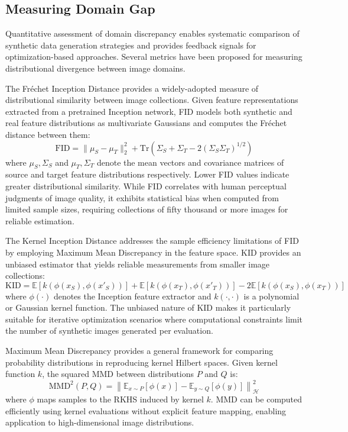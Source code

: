 \subsection{Measuring Domain Gap}

Quantitative assessment of domain discrepancy enables systematic comparison of synthetic data generation strategies and provides feedback signals for optimization-based approaches. Several metrics have been proposed for measuring distributional divergence between image domains.

The Fr\'{e}chet Inception Distance provides a widely-adopted measure of distributional similarity between image collections. Given feature representations extracted from a pretrained Inception network, FID models both synthetic and real feature distributions as multivariate Gaussians and computes the Fr\'{e}chet distance between them:
\begin{equation}
\text{FID} = \|\mu_S - \mu_T\|_2^2 + \text{Tr}\left(\Sigma_S + \Sigma_T - 2(\Sigma_S \Sigma_T)^{1/2}\right)
\end{equation}
where $\mu_S, \Sigma_S$ and $\mu_T, \Sigma_T$ denote the mean vectors and covariance matrices of source and target feature distributions respectively. Lower FID values indicate greater distributional similarity. While FID correlates with human perceptual judgments of image quality, it exhibits statistical bias when computed from limited sample sizes, requiring collections of fifty thousand or more images for reliable estimation.

The Kernel Inception Distance addresses the sample efficiency limitations of FID by employing Maximum Mean Discrepancy in the feature space. KID provides an unbiased estimator that yields reliable measurements from smaller image collections:
\begin{equation}
\text{KID} = \mathbb{E}[k(\phi(x_S), \phi(x'_S))] + \mathbb{E}[k(\phi(x_T), \phi(x'_T))] - 2\mathbb{E}[k(\phi(x_S), \phi(x_T))]
\end{equation}
where $\phi(\cdot)$ denotes the Inception feature extractor and $k(\cdot, \cdot)$ is a polynomial or Gaussian kernel function. The unbiased nature of KID makes it particularly suitable for iterative optimization scenarios where computational constraints limit the number of synthetic images generated per evaluation.

Maximum Mean Discrepancy provides a general framework for comparing probability distributions in reproducing kernel Hilbert spaces. Given kernel function $k$, the squared MMD between distributions $P$ and $Q$ is:
\begin{equation}
\text{MMD}^2(P, Q) = \left\| \mathbb{E}_{x \sim P}[\phi(x)] - \mathbb{E}_{y \sim Q}[\phi(y)] \right\|_{\mathcal{H}}^2
\end{equation}
where $\phi$ maps samples to the RKHS induced by kernel $k$. MMD can be computed efficiently using kernel evaluations without explicit feature mapping, enabling application to high-dimensional image distributions.

